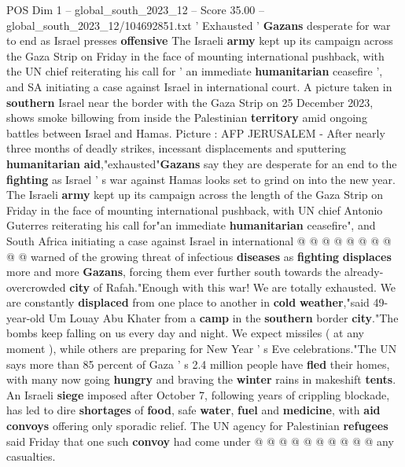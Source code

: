 \begin{textsample}{POS Dim 1 – global\_south\_2023\_12 – Score 35.00 – global\_south\_2023\_12/104692851.txt}  \label{ex:f1_pos_037}
' Exhausted ' \textbf{Gazans} desperate for war to end as Israel presses \textbf{offensive} The Israeli \textbf{army} kept up its campaign across the Gaza Strip on Friday in the face of mounting international pushback, with the UN chief reiterating his call for ' an immediate \textbf{humanitarian} ceasefire ', and SA initiating a case against Israel in international court.
A picture taken in \textbf{southern} Israel near the border with the Gaza Strip on 25 December 2023, shows smoke billowing from inside the Palestinian \textbf{territory} amid ongoing battles between Israel and Hamas.
Picture : AFP JERUSALEM - After nearly three months of deadly strikes, incessant displacements and sputtering \textbf{humanitarian} \textbf{aid},"exhausted"\textbf{Gazans} say they are desperate for an end to the \textbf{fighting} as Israel ' s war against Hamas looks set to grind on into the new year.
The Israeli \textbf{army} kept up its campaign across the length of the Gaza Strip on Friday in the face of mounting international pushback, with UN chief Antonio Guterres reiterating his call for"an immediate \textbf{humanitarian} ceasefire", and South Africa initiating a case against Israel in international @ @ @ @ @ @ @ @ @ @ warned of the growing threat of infectious \textbf{diseases} as \textbf{fighting} \textbf{displaces} more and more \textbf{Gazans}, forcing them ever further south towards the already-overcrowded \textbf{city} of Rafah."Enough with this war!
We are totally exhausted.
We are constantly \textbf{displaced} from one place to another in \textbf{cold} \textbf{weather},"said 49-year-old Um Louay Abu Khater from a \textbf{camp} in the \textbf{southern} border \textbf{city}."The bombs keep falling on us every day and night.
We expect missiles ( at any moment ), while others are preparing for New Year ' s Eve celebrations."The UN says more than 85 percent of Gaza ' s 2.4 million people have \textbf{fled} their homes, with many now going \textbf{hungry} and braving the \textbf{winter} rains in makeshift \textbf{tents}.
An Israeli \textbf{siege} imposed after October 7, following years of crippling blockade, has led to dire \textbf{shortages} of \textbf{food}, safe \textbf{water}, \textbf{fuel} and \textbf{medicine}, with \textbf{aid} \textbf{convoys} offering only sporadic relief.
The UN agency for Palestinian \textbf{refugees} said Friday that one such \textbf{convoy} had come under @ @ @ @ @ @ @ @ @ @ any casualties.

\end{textsample}
